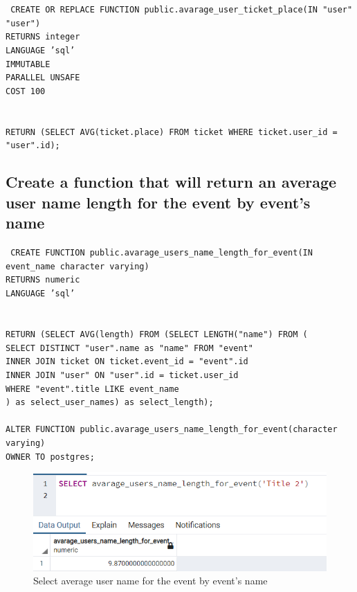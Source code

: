 \texttt{
    CREATE OR REPLACE FUNCTION public.avarage\_user\_ticket\_place(IN "user" "user") \\
    RETURNS integer \\
    LANGUAGE 'sql' \\
    IMMUTABLE \\
    PARALLEL UNSAFE \\
    COST 100 \\
    \\
    \\
    RETURN (SELECT AVG(ticket.place) FROM ticket WHERE ticket.user\_id = "user".id); \\
}

\subsection{Create a function that will return an average user name length for the event by event's name}\label{subsec:select-avarage-user-name-for-the-event-by-event's-name}

\texttt{
    CREATE FUNCTION public.avarage\_users\_name\_length\_for\_event(IN event\_name character varying) \\
    RETURNS numeric \\
    LANGUAGE 'sql' \\
    \\
    \\
    RETURN (SELECT AVG(length) FROM (SELECT LENGTH("name") FROM ( \\
    SELECT DISTINCT "user".name as "name" FROM "event" \\
    INNER JOIN ticket ON ticket.event\_id = "event".id \\
    INNER JOIN "user" ON "user".id = ticket.user\_id \\
    WHERE "event".title LIKE event\_name \\
    ) as select\_user\_names) as select\_length); \\
    \\
    ALTER FUNCTION public.avarage\_users\_name\_length\_for\_event(character varying) \\
    OWNER TO postgres; \\
}

\begin{figure}[h]
    \centering
    \includegraphics[]{images/avarage_user_name_event}
    \caption{Select average user name for the event by event's name}
    \label{fig:db_average_user_name_length}
\end{figure}

